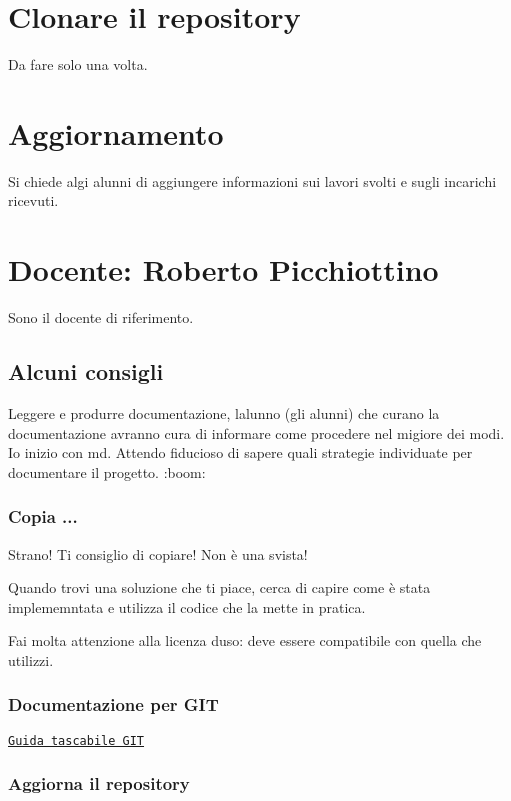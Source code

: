\section*{Clonare il repository}

Da fare solo una volta. 
 \section*{Aggiornamento}

Si chiede algi alunni di aggiungere informazioni sui lavori svolti e sugli incarichi ricevuti.

\section*{Docente\+: Roberto Picchiottino}

Sono il docente di riferimento.

\subsection*{Alcuni consigli}

Leggere e produrre documentazione, l\textquotesingle{}alunno (gli alunni) che curano la documentazione avranno cura di informare come procedere nel migiore dei modi. Io inizio con md. Attendo fiducioso di sapere quali strategie individuate per documentare il progetto. \+:boom\+:

\subsubsection*{Copia ...}

Strano! Ti consiglio di copiare! Non è una svista!

Quando trovi una soluzione che ti piace, cerca di capire come è stata implememntata e utilizza il codice che la mette in pratica.

Fai molta attenzione alla licenza d\textquotesingle{}uso\+: deve essere compatibile con quella che utilizzi.

\subsubsection*{Documentazione per G\+IT}

\href{https://rogerdudler.github.io/git-guide/index.it.html}{\tt Guida tascabile G\+IT} \subsubsection*{Aggiorna il repository}

